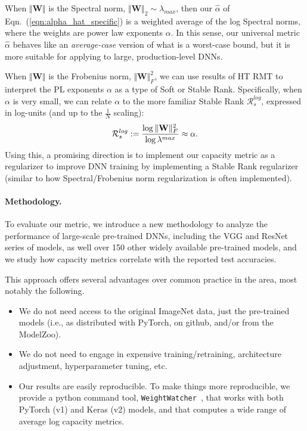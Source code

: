 \vspace{-4mm}

When $\Vert\mathbf{W}\Vert$ is the Spectral norm, $\Vert\mathbf{W}\Vert_{2}\sim\lambda_{max}$, then our $\hat{\alpha}$ of Eqn.~(\ref{eqn:alpha_hat_specific}) is a weighted average of the log Spectral norms, where the weights are power law exponents $\alpha$. 
In this sense, our universal metric $\hat{\alpha}$ behaves like an \emph{average-case} version of what is a worst-case bound, but it is more suitable for applying to large, production-level DNNs.
 
When $\Vert\mathbf{W}\Vert$ is the Frobenius norm, $\Vert\mathbf{W}\Vert^{2}_{F}$, we can use results of HT RMT to interpret the PL exponents $\alpha$ as a type of Soft or Stable Rank. 
Specifically, when $\alpha$ is very small, we can relate $\alpha$ to the more familiar Stable Rank $\mathcal{R}^{log}_{s}$, expressed in log-units (and up to the $\frac{1}{N}$ scaling):
\vspace{-2mm}
\begin{equation}
\mathcal{R}^{log}_{s}:=\dfrac{\log\Vert\mathbf{W}\Vert^{2}_{F}}{\log\lambda^{max}}  \approx \alpha  .
\vspace{-1mm}
\end{equation}
Using this, a promising direction is to implement our capacity metric as a regularizer to improve DNN training by implementing a Stable Rank regularizer (similar to how Spectral/Frobenius norm regularization is often implemented).  %


\vspace{-3mm}
\paragraph{Methodology.} 
To evaluate our metric, we introduce a new methodology to analyze the performance of large-scale pre-trained DNNs, including the VGG and ResNet series of models, as well over 150 other widely available pre-trained models, and we study how capacity metrics correlate with the reported test accuracies.
 
This approach offers several advantages over common practice in the area, most notably the following.
\begin{itemize}
\item 
We do not need access to the original ImageNet data, just the pre-trained models (i.e., as distributed with PyTorch, on github, and/or from the ModelZoo).
\item
We do not need to engage in expensive training/retraining, architecture adjustment, hyperparameter tuning, etc.
\item 
Our results are easily reproducible.
To make things more reproducible, we provide a python command tool, \texttt{WeightWatcher}~\cite{weightwatcher_package_justURL}, that works with both PyTorch (v1) and Keras (v2) models, and that computes a wide range of average log capacity metrics.
\end{itemize}
 
